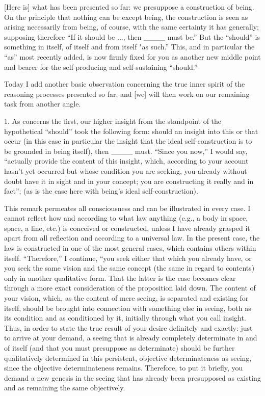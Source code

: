[Here is] what has been presented so far:
we presuppose a construction of being.
On the principle that nothing can be except being,
the construction is seen as arising necessarily from being,
of course, with the same certainty it has generally;
supposing therefore “If it should be ..., then ____ must be.”
But the “should” is something in itself, of itself and from itself "as such.”
This, and in particular the “as” most recently added,
is now firmly fixed for you as another new middle point
and bearer for the self-producing and self-sustaining “should.”

Today I add another basic observation
concerning the true inner spirit of
the reasoning processes presented so far,
and [we] will then work on
our remaining task from another angle.

1. As concerns the first,
our higher insight from the standpoint of
the hypothetical “should” took the following form:
should an insight into this or that occur
(in this case in particular the insight that
the ideal self-construction is to be grounded in being itself),
then ____ must.
“Since you now,” I would say,
“actually provide the content of this insight,
which, according to your account hasn't yet occurred
but whose condition you are seeking,
you already without doubt have it
in sight and in your concept;
you are constructing it really and in fact”;
(as is the case here with being's ideal self-construction).

This remark permeates all consciousness
and can be illustrated in every case.
I cannot reflect how and according to what law anything
(e.g., a body in space, space, a line, etc.)
is conceived or constructed,
unless I have already grasped it apart from all reflection
and according to a universal law.
In the present case, the law is constructed in
one of the most general cases,
which contains others within itself.
“Therefore,” I continue, “you seek either
that which you already have,
or you seek the same vision and the same concept
(the same in regard to contents)
only in another qualitative form.
That the latter is the case becomes clear
through a more exact consideration of the proposition laid down.
The content of your vision, which, as the content of
mere seeing, is separated and existing for itself,
should be brought into connection with something else in seeing,
both as its condition and as conditioned by it,
initially through what you call insight.
Thus, in order to state the true result of
your desire definitely and exactly:
just to arrive at your demand,
a seeing that is already completely determinate in and of itself
(and that you must presuppose as determinate)
should be further qualitatively determined
in this persistent, objective determinateness as seeing,
since the objective determinateness remains.
Therefore, to put it briefly,
you demand a new genesis in the seeing
that has already been presupposed as existing
and as remaining the same objectively.

